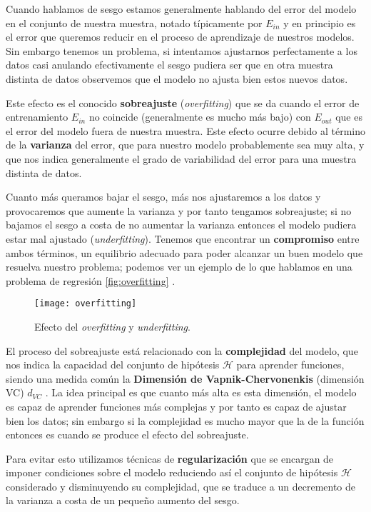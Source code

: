 Cuando hablamos de sesgo estamos generalmente hablando del error del modelo en el conjunto de nuestra muestra, notado típicamente por $E_{in}$ y en principio es el error que queremos reducir en el proceso de aprendizaje de nuestros modelos. Sin embargo tenemos un problema, si intentamos ajustarnos perfectamente a los datos casi anulando efectivamente el sesgo pudiera ser que en otra muestra distinta de datos observemos que el modelo no ajusta bien estos nuevos datos.

Este efecto es el conocido \textbf{sobreajuste} (\emph{overfitting}) que se da cuando el error de entrenamiento $E_{in}$ no coincide (generalmente es mucho más bajo) con $E_{out}$ que es el error del modelo fuera de nuestra muestra. Este efecto ocurre debido al término de la \textbf{varianza} del error, que para nuestro modelo probablemente sea muy alta, y que nos indica generalmente el grado de variabilidad del error para una muestra distinta de datos.

Cuanto más queramos bajar el sesgo, más nos ajustaremos a los datos y provocaremos que aumente la varianza y por tanto tengamos sobreajuste; si no bajamos el sesgo a costa de no aumentar la varianza entonces el modelo pudiera estar mal ajustado (\emph{underfitting}). Tenemos que encontrar un \textbf{compromiso} entre ambos términos, un equilibrio adecuado para poder alcanzar un buen modelo que resuelva nuestro problema; podemos ver un ejemplo de lo que hablamos en una problema de regresión \autoref{fig:overfitting} \cite{bhande2018overfitting}.

\begin{figure}[htpb]
  \centering
  \texttt{[image: overfitting]}
  \caption{Efecto del \emph{overfitting} y \emph{underfitting}.}
  \label{fig:overfitting}
\end{figure}

El proceso del sobreajuste está relacionado con la \textbf{complejidad} del modelo, que nos indica la capacidad del conjunto de hipótesis $\mathcal{H}$ para aprender funciones, siendo una medida común
la \textbf{Dimensión de Vapnik-Chervonenkis} (dimensión VC) $d_{VC}$ \cite{vapnik2015uniform}.  La idea principal es que cuanto más alta es esta dimensión, el modelo es capaz de aprender funciones más complejas y por tanto es capaz de ajustar bien los datos; sin embargo si la complejidad es mucho mayor que la de la función entonces es cuando se produce el efecto del sobreajuste.

Para evitar esto utilizamos técnicas de \textbf{regularización} que se encargan de imponer condiciones sobre el modelo reduciendo así el conjunto de hipótesis $\mathcal{H}$ considerado y disminuyendo su complejidad, que se traduce a un decremento de la varianza a costa de un pequeño aumento del sesgo.

